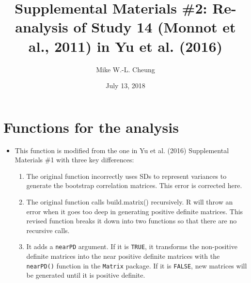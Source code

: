 \documentclass[]{article}
\title{Supplemental Materials \#2: Re-analysis of Study 14 (Monnot et al.,
2011) in Yu et al. (2016)}
\author{Mike W.-L. Cheung}
\date{July 13, 2018}
\providecommand{\tightlist}{%
  \setlength{\itemsep}{0pt}\setlength{\parskip}{0pt}}
\begin{document}
\maketitle

{
\setcounter{tocdepth}{2}
\tableofcontents
}
\section{Functions for the analysis}\label{functions-for-the-analysis}

\begin{itemize}
\tightlist
\item
  This function is modified from the one in Yu et al. (2016)
  Supplemental Materials \#1 with three key differences:

  \begin{enumerate}
  \def\labelenumi{\arabic{enumi}.}
  \tightlist
  \item
    The original function incorrectly uses SDs to represent variances to
    generate the bootstrap correlation matrices. This error is corrected
    here.
  \item
    The original function calls build.matrix() recursively. R will throw
    an error when it goes too deep in generating positive definite
    matrices. This revised function breaks it down into two functions so
    that there are no recursive calls.
  \item
    It adds a \texttt{nearPD} argument. If it is \texttt{TRUE}, it
    transforms the non-positive definite matrices into the near positive
    definite matrices with the \texttt{nearPD()} function in the
    \texttt{Matrix} package. If it is \texttt{FALSE}, new matrices will
    be generated until it is positive definite.
  \end{enumerate}
\end{itemize}
\end{document}
